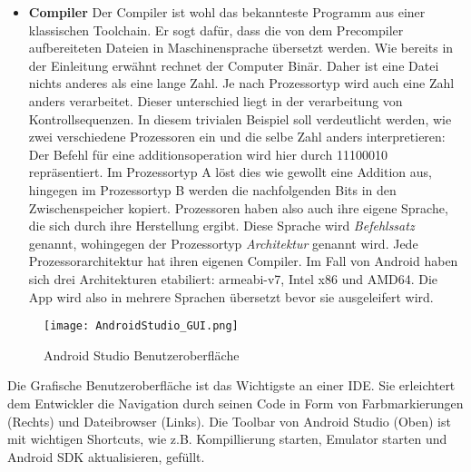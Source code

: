 \begin{itemize}
\item \textbf{Compiler} Der Compiler ist wohl das bekannteste Programm aus einer klassischen Toolchain. Er sogt dafür, dass die von dem Precompiler aufbereiteten Dateien in Maschinensprache übersetzt werden.
Wie bereits in der Einleitung erwähnt rechnet der Computer Binär. Daher ist eine Datei nichts anderes als eine lange Zahl. Je nach Prozessortyp wird auch eine Zahl anders verarbeitet. Dieser unterschied liegt in der verarbeitung von Kontrollsequenzen. In diesem trivialen Beispiel soll verdeutlicht werden, wie zwei verschiedene Prozessoren ein und die selbe Zahl anders interpretieren: Der Befehl für eine additionsoperation wird hier durch 11100010 repräsentiert. Im Prozessortyp A löst dies wie gewollt eine Addition aus, hingegen im Prozessortyp B werden die nachfolgenden Bits in den Zwischenspeicher kopiert. Prozessoren haben also auch ihre eigene Sprache, die sich durch ihre Herstellung ergibt. Diese Sprache wird \textit{Befehlssatz} genannt, wohingegen der Prozessortyp \textit{Architektur} genannt wird. Jede Prozessorarchitektur hat ihren eigenen Compiler.
Im Fall von Android haben sich drei Architekturen etabiliert: armeabi-v7, Intel x86 und AMD64. Die App wird also in mehrere Sprachen übersetzt bevor sie ausgeleifert wird.
\end{itemize}

\newpage

\begin{figure}[htbp] 
  \centering
     \texttt{[image: AndroidStudio\_GUI.png]}
  \caption{Android Studio Benutzeroberfläche \cite{ASGUI}}
  \label{fig:Android Studio GUI}
\end{figure}
Die Grafische Benutzeroberfläche ist das Wichtigste an einer IDE. Sie erleichtert dem Entwickler die Navigation durch seinen Code in Form von Farbmarkierungen (Rechts) und Dateibrowser (Links).
Die Toolbar von Android Studio (Oben) ist mit wichtigen Shortcuts, wie z.B. Kompillierung starten, Emulator starten und Android SDK aktualisieren, gefüllt.

